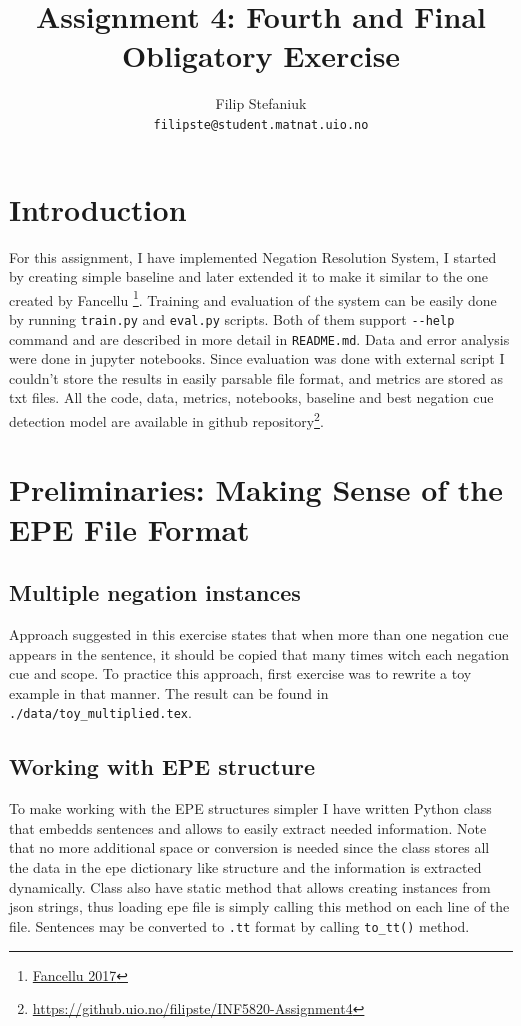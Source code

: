 \documentclass{article}
\title{Assignment 4: Fourth and Final Obligatory Exercise} %
\author{Filip Stefaniuk\\ \texttt{filipste@student.matnat.uio.no}} %
\begin{document}
\maketitle
\section{Introduction}
For this assignment, I have implemented Negation Resolution System, I started by creating simple baseline and
later extended it to make it similar to the one created by Fancellu \footnote{\href{http://www.aclweb.org/anthology/P16-1047}{Fancellu 2017}}.
Training and evaluation of the system can be easily done by running \lstinline{train.py} and \lstinline{eval.py}
scripts. Both of them support \lstinline{--help} command and are described in more detail in
\lstinline{README.md}. Data and error analysis were done in jupyter notebooks. Since evaluation
was done with external script I couldn't store the results in easily parsable file format, and metrics are
stored as txt files. All the code, data, metrics, notebooks, baseline and best negation cue detection model
are available in github repository\footnote{\href{https://github.uio.no/filipste/INF5820-Assignment4}{https://github.uio.no/filipste/INF5820-Assignment4}}.
\section{Preliminaries: Making Sense of the EPE File Format}


\subsection{Multiple negation instances}
Approach suggested in this exercise states that when more than one negation
cue appears in the sentence, it should be copied that many times witch each
negation cue and scope. To practice this approach, first exercise was to rewrite
a toy example in that manner. The result can be found in \lstinline{./data/toy_multiplied.tex}.

\subsection{Working with EPE structure}
To make working with the EPE structures simpler I have written Python class that embedds
sentences and allows to easily extract needed information. Note that no more additional
space or conversion is needed since the class stores all the data in the epe dictionary like
structure and the information is extracted dynamically. Class also have static method that
allows creating instances from json strings, thus loading epe file is simply calling this method
on each line of the file. Sentences may be converted to \lstinline{.tt} format by calling
\lstinline{to_tt()} method.
\end{document}
